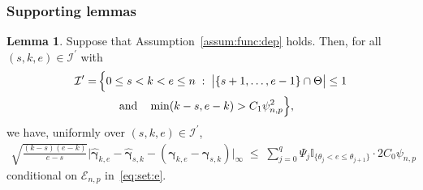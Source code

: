 \documentclass[11pt, a4paper]{article}
\newcommand{\mc}{\mathcal}
\renewcommand{\l}{\left}
\renewcommand{\r}{\right}
\def\wh{\widehat}
\newcommand{\cp}{\theta}
\newcommand{\Cp}{\Theta}
\theoremstyle{definition}
\theoremstyle{definition}
\theoremstyle{definition}
\newtheorem{lem}[thm]{Lemma}
\theoremstyle{definition}
\theoremstyle{definition}
\theoremstyle{remark}
\theoremstyle{definition}
\theoremstyle{definition}
\theoremstyle{definition}
\begin{document}
\subsubsection{Supporting lemmas}

\begin{lem}
	\label{lem:gamma}
	Suppose that Assumption~\ref{assum:func:dep} holds. 
	Then, for all $(s, k, e) \in \mc I^\prime$ with
	\begin{align*}
	\mc I^\prime =& \, \Bigl\{0 \le s < k < e \le n \; : \; \bigl\vert \{s + 1, \ldots, e - 1\} \cap \Cp \bigr\vert \le 1 
	\\ 
	& \qquad \text{and} \quad \min(k - s, e - k) > C_1 \psi_{n, p}^2 \Bigr\},
	\end{align*}
	we have, uniformly over $(s, k, e) \in \mc I^\prime$,
	\begin{align*}
    \sqrt{\frac{(k - s)(e - k)}{e - s}} \bigl\vert \wh{\bm\gamma}_{k, e} - \wh{\bm\gamma}_{s, k} - \l( \bm\gamma_{k, e} - \bm\gamma_{s, k} \r) \bigr\vert_\infty \;
	\le \; \sum_{j = 0}^q \Psi_j \mathbb{I}_{\{\cp_j < e \le \cp_{j + 1}\}} \cdot 2 C_0 \psi_{n, p} 
	\end{align*}
	conditional on $\mc E_{n, p}$ in~\eqref{eq:set:e}.
\end{lem}
\end{document}
